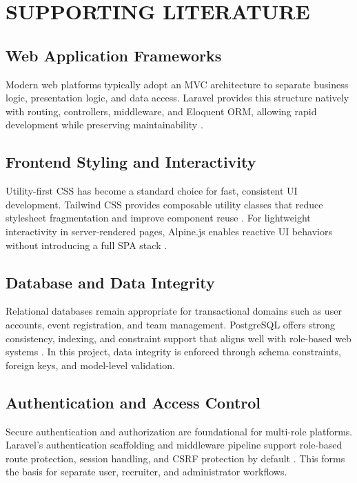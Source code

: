 \chapter{SUPPORTING LITERATURE}

\section{Web Application Frameworks}
Modern web platforms typically adopt an MVC architecture to separate business logic, presentation logic, and data access. Laravel provides this structure natively with routing, controllers, middleware, and Eloquent ORM, allowing rapid development while preserving maintainability \cite{laravel_docs}.

\section{Frontend Styling and Interactivity}
Utility-first CSS has become a standard choice for fast, consistent UI development. Tailwind CSS provides composable utility classes that reduce stylesheet fragmentation and improve component reuse \cite{tailwind_docs}. For lightweight interactivity in server-rendered pages, Alpine.js enables reactive UI behaviors without introducing a full SPA stack \cite{alpine_docs}.

\section{Database and Data Integrity}
Relational databases remain appropriate for transactional domains such as user accounts, event registration, and team management. PostgreSQL offers strong consistency, indexing, and constraint support that aligns well with role-based web systems \cite{postgres_docs}. In this project, data integrity is enforced through schema constraints, foreign keys, and model-level validation.

\section{Authentication and Access Control}
Secure authentication and authorization are foundational for multi-role platforms. Laravel's authentication scaffolding and middleware pipeline support role-based route protection, session handling, and CSRF protection by default \cite{laravel_auth_docs}. This forms the basis for separate user, recruiter, and administrator workflows.
